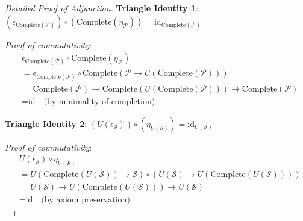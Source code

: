 \documentclass[11pt,a4paper]{article}
\theoremstyle{definition}
\theoremstyle{remark}
\begin{document}
\begin{proof}[Detailed Proof of Adjunction]
\textbf{Triangle Identity 1}: $(\epsilon_{\text{Complete}(\mathcal{P})}) \circ (\text{Complete}(\eta_{\mathcal{P}})) = \text{id}_{\text{Complete}(\mathcal{P})}$

\begin{center}
\end{center}

\textit{Proof of commutativity}:
\begin{align*}
&\epsilon_{\text{Complete}(\mathcal{P})} \circ \text{Complete}(\eta_{\mathcal{P}}) \\
&= \epsilon_{\text{Complete}(\mathcal{P})} \circ \text{Complete}(\mathcal{P} \to U(\text{Complete}(\mathcal{P}))) \\
&= \text{Complete}(\mathcal{P}) \to \text{Complete}(U(\text{Complete}(\mathcal{P}))) \to \text{Complete}(\mathcal{P}) \\
&= \text{id} \quad \text{(by minimality of completion)}
\end{align*}

\textbf{Triangle Identity 2}: $(U(\epsilon_{\mathcal{S}})) \circ (\eta_{U(\mathcal{S})}) = \text{id}_{U(\mathcal{S})}$

\begin{center}
\end{center}

\textit{Proof of commutativity}:
\begin{align*}
&U(\epsilon_{\mathcal{S}}) \circ \eta_{U(\mathcal{S})} \\
&= U(\text{Complete}(U(\mathcal{S})) \to \mathcal{S}) \circ (U(\mathcal{S}) \to U(\text{Complete}(U(\mathcal{S})))) \\
&= U(\mathcal{S}) \to U(\text{Complete}(U(\mathcal{S}))) \to U(\mathcal{S}) \\
&= \text{id} \quad \text{(by axiom preservation)}
\end{align*}


\end{proof}
\end{document}

